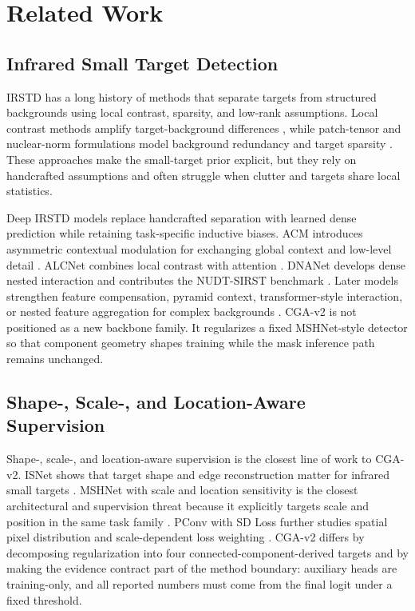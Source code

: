 \documentclass[letterpaper]{article}
\begin{document}
\section{Related Work}

\subsection{Infrared Small Target Detection}

IRSTD has a long history of methods that separate targets from structured backgrounds using local contrast, sparsity, and low-rank assumptions. Local contrast methods amplify target-background differences \citep{chen2014local}, while patch-tensor and nuclear-norm formulations model background redundancy and target sparsity \citep{dai2017ript,zhang2019pstnn}. These approaches make the small-target prior explicit, but they rely on handcrafted assumptions and often struggle when clutter and targets share local statistics.

Deep IRSTD models replace handcrafted separation with learned dense prediction while retaining task-specific inductive biases. ACM introduces asymmetric contextual modulation for exchanging global context and low-level detail \citep{dai2021acm}. ALCNet combines local contrast with attention \citep{dai2021alcnet}. DNANet develops dense nested interaction and contributes the NUDT-SIRST benchmark \citep{li2023dnanet}. Later models strengthen feature compensation, pyramid context, transformer-style interaction, or nested feature aggregation for complex backgrounds \citep{zhang2022fc3net,zhang2023agpcnet,chen2024tciformer,wu2023uiunet}. CGA-v2 is not positioned as a new backbone family. It regularizes a fixed MSHNet-style detector so that component geometry shapes training while the mask inference path remains unchanged.

\subsection{Shape-, Scale-, and Location-Aware Supervision}

Shape-, scale-, and location-aware supervision is the closest line of work to CGA-v2. ISNet shows that target shape and edge reconstruction matter for infrared small targets \citep{zhang2022isnet}. MSHNet with scale and location sensitivity is the closest architectural and supervision threat because it explicitly targets scale and position in the same task family \citep{liu2024sls}. PConv with SD Loss further studies spatial pixel distribution and scale-dependent loss weighting \citep{yang2025pconv}. CGA-v2 differs by decomposing regularization into four connected-component-derived targets and by making the evidence contract part of the method boundary: auxiliary heads are training-only, and all reported numbers must come from the final logit under a fixed threshold.
\end{document}
